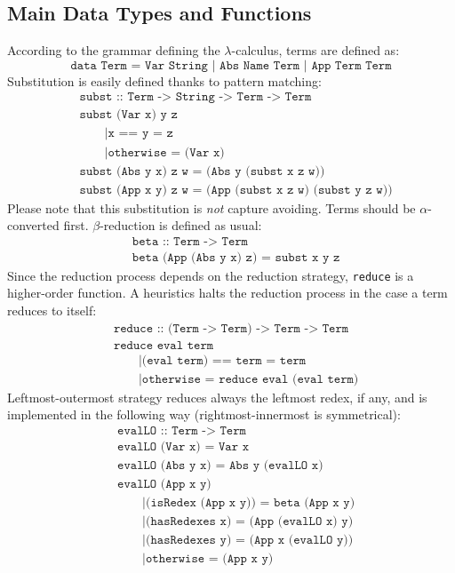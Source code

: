 \subsection{Main Data Types and Functions}
According to the grammar defining the $\lambda$-calculus, terms are defined as:
$$
\texttt{data Term = Var String | Abs Name Term | App Term Term}
$$
Substitution is easily defined thanks to pattern matching:
\begin{align*}
&\texttt{subst :: Term -> String -> Term -> Term}\\
&\texttt{subst (Var x) y z}\\
&\qquad\texttt{|x == y = z}\\
&\qquad\texttt{|otherwise = (Var x)}\\
&\texttt{subst (Abs y x) z w = (Abs y (subst x z w))}\\
&\texttt{subst (App x y) z w = (App (subst x z w) (subst y z w))}
\end{align*}
Please note that this substitution is \emph{not} capture avoiding. Terms should be $\alpha$-converted first. $\beta$-reduction is defined as usual:
\begin{align*}
&\texttt{beta :: Term -> Term}\\
&\texttt{beta (App (Abs y x) z) = subst x y z}
\end{align*}
Since the reduction process depends on the reduction strategy, \texttt{reduce} is a higher-order function. A heuristics halts the reduction process in the case a term reduces to itself:
\begin{align*}
&\texttt{reduce :: (Term -> Term) -> Term -> Term}\\
&\texttt{reduce eval term}\\
&\qquad\texttt{|(eval term) == term = term}\\
&\qquad\texttt{|otherwise = reduce eval (eval term)}
\end{align*}
Leftmost-outermost strategy reduces always the leftmost redex, if any, and is implemented in the following way (rightmost-innermost is symmetrical):
\begin{align*}
&\texttt{evalLO :: Term -> Term}\\
&\texttt{evalLO (Var x) = Var x}\\
&\texttt{evalLO (Abs y x) = Abs y (evalLO x)}\\
&\texttt{evalLO (App x y)}\\
&\qquad\texttt{|(isRedex (App x y)) = beta (App x y)}\\
&\qquad\texttt{|(hasRedexes x) = (App (evalLO x) y)}\\
&\qquad\texttt{|(hasRedexes y) = (App x (evalLO y))}\\
&\qquad\texttt{|otherwise = (App x y)}
\end{align*}
